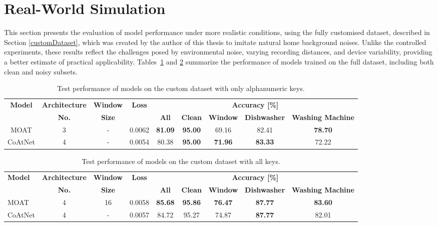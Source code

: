 \documentclass[a4paper,11pt,twoside]{report}
\theoremstyle{definition}
\begin{document}
\section{Real-World Simulation}


This section presents the evaluation of model performance under more realistic conditions, using the fully customised dataset, described in Section \ref{customDataset}, which was created by the author of this thesis to imitate natural home background noises. Unlike the controlled experiments, these results reflect the challenges posed by environmental noise, varying recording distances, and device variability, providing a better estimate of practical applicability. Tables~\ref{tab:custom_alphanumeric} and \ref{tab:custom_all_keys} summarize the performance of models trained on the full dataset, including both clean and noisy subsets.


\begin{table}[h!]
\centering
\caption{Test performance of  models on the custom dataset with only alphanumeric keys.}
\begin{adjustbox}{max width=\textwidth}
\begin{tabular}{c|c|c|c|ccccc}
\hline
\textbf{Model} & \textbf{Architecture} & \textbf{Window} & \textbf{Loss} & \multicolumn{5}{c}{\textbf{Accuracy [\%]}} \\
\cline{5-9}
       &   \textbf{No.}  &   \textbf{Size}   &   & \textbf{All} & \textbf{Clean} & \textbf{Window} & \textbf{Dishwasher} & \textbf{Washing Machine}  \\
\hline
MOAT & 3 & - & 0.0062 & \textbf{81.09} & \textbf{95.00} & 69.16 & 82.41 & \textbf{78.70} \\
CoAtNet & 4 & - & 0.0054 & 80.38 & \textbf{95.00} & \textbf{71.96} & \textbf{83.33} & 72.22 \\
\hline
\end{tabular}
\end{adjustbox}
\label{tab:custom_alphanumeric}
\end{table}


\begin{table}[h!]
\centering
\caption{Test performance of models on the custom dataset with all keys.}
\begin{adjustbox}{max width=\textwidth}
\begin{tabular}{l|c|c|c|ccccc}
\hline
\textbf{Model} & \textbf{Architecture} & \textbf{Window} & \textbf{Loss} & \multicolumn{5}{c}{\textbf{Accuracy [\%]}} \\
\cline{5-9}
       &   \textbf{No.}  &   \textbf{Size}   &   & \textbf{All} & \textbf{Clean} & \textbf{Window} & \textbf{Dishwasher} & \textbf{Washing Machine}  \\
\hline
MOAT & 4 & 16 & 0.0058 & \textbf{85.68} & \textbf{95.86} & \textbf{76.47} & \textbf{87.77} & \textbf{83.60} \\
CoAtNet & 4 & - & 0.0057 & 84.72 & 95.27 & 74.87 & \textbf{87.77} & 82.01 \\
\hline
\end{tabular}
\end{adjustbox}
\label{tab:custom_all_keys}
\end{table}
\end{document}
